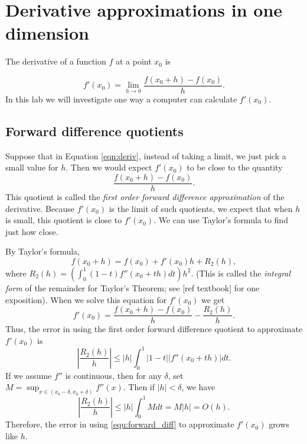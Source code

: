 \label{lab:NumericalDerivatives}


\section*{Derivative approximations in one dimension}
The derivative of a function $f$ at a point $x_0$ is

\begin{equation}
\label{eqn:deriv}
f'(x_0) = \lim_{h\rightarrow 0} \frac{f(x_0 + h)-f(x_0)}{h}.
\end{equation}
In this lab we will investigate one way a computer can calculate $f'(x_0)$. 

\subsection*{Forward difference quotients}
Suppose that in Equation \ref{eqn:deriv}, instead of taking a limit, we just pick a small value for $h$. 
Then we would expect $f'(x_0)$ to be close to the quantity
\begin{equation}\label{equ:forward_diff}
 \frac{f(x_0 + h)-f(x_0)}{h}.
\end{equation}
This quotient is called the \emph{first order forward difference approximation} of the derivative. 
Because $f'(x_0)$ is the limit of such quotients, we expect that when $h$ is small, this quotient is close to $f'(x_0)$. 
We can use Taylor's formula to find just how close.

By Taylor's formula,
\[
f(x_0+h) = f(x_0) + f'(x_0)h + R_2(h),
\]
where $R_2(h) = \left( \int_0^1 (1-t) f''(x_0+th) dt \right) h^2$. 
(This is called the \emph{integral form} of the remainder for Taylor's Theorem; see [ref textbook] for one exposition). When we solve this equation for $f'(x_0)$ we get
\begin{equation}\label{equ:forward_diff_with_remainder}
f'(x_0) = \frac{f(x_0+h)-f(x_0)}{h} - \frac{R_2(h)}{h}.
\end{equation}
Thus, the error in using the first order forward difference quotient to approximate $f'(x_0)$ is 
\[
\left | \frac{R_2(h)}{h} \right | \leq |h| \int_0^1 |1 - t||f''(x_0+th)|dt.
\]
If we assume $f''$ is continuous, then for any $\delta$, set $M = \sup_{x \in (x_0-\delta, x_0+\delta)} f''(x)$. Then if $|h| < \delta$, we have
\[
\left | \frac{R_2(h)}{h} \right | \leq |h|\int_0^1 M dt = M|h| = O(h).
\]
Therefore, the error in using \eqref{equ:forward_diff} to approximate $f'(x_0)$ grows like $h$.




